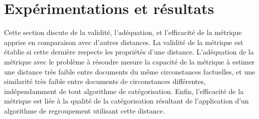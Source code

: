 
\section{Expérimentations et résultats}
\label{sec:similarite:experimentations}
Cette section discute de la validité, l'adéquation, et l'efficacité de la métrique apprise en comparaison avec d'autres distances. La validité de la métrique est établie si cette dernière respecte les propriétés d'une distance. L'adéquation de la métrique avec le problème à résoudre mesure la capacité de la métrique à estimer une distance très faible entre documents du même circonstances factuelles, et une similarité très faible entre documents de circonstances différentes, indépendamment de tout algorithme de catégorisation. Enfin, l'efficacité de la métrique est liée à la qualité de la catégorisation résultant de l'application d'un algorithme de regroupement  utilisant cette distance.


